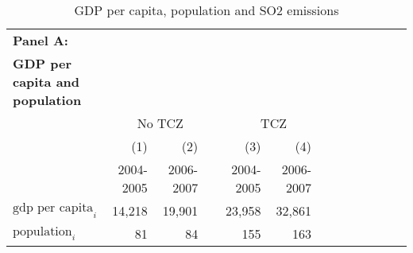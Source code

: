\documentclass[12pt]{article}
\begin{document}
\begin{table}[!htb] \centering
    \caption{\\ GDP per capita, population and SO2 emissions}
      \begin{adjustbox}{width=\textwidth, totalheight=\baselineskip,keepaspectratio}
    \label{table_3}
    \begin{tabular}{lrrrrrrrrrrrr}
      \multicolumn{1}{l}{\textbf{\small Panel A:}} \\
      \multicolumn{1}{l}{\textbf{\small GDP per capita and population}} \\
      \toprule
     & \multicolumn{3}{c}{No TCZ} & \multicolumn{3}{c}{TCZ} \\
      & (1)  & (2) & & (3)  & (4) \\
      & 2004-2005 &  2006-2007 & & 2004-2005 &2006-2007  \\
      
      \midrule
      $\text{gdp per capita}_i$    & 14,218 & 19,901 & & 23,958 & 32,861 \\
$\text{population}_i$ &     81 &     84 & &   155 &    163  \\


\end{tabular}
\end{adjustbox}
\end{table}
\end{document}
